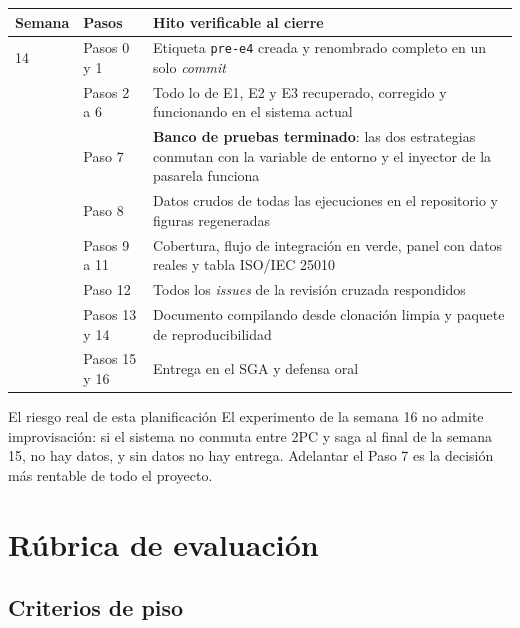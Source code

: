 \documentclass[11pt,a4paper]{article}
\begin{document}
	\begin{center}
		\small
		\begin{tabular}{@{}p{1.6cm}p{5.6cm}p{7.6cm}@{}}
			\toprule
			\textbf{Semana} & \textbf{Pasos} & \textbf{Hito verificable al cierre} \\
			\midrule
			14 & Pasos 0 y 1 & Etiqueta \texttt{pre-e4} creada y renombrado completo en un solo \emph{commit} \\
			\addlinespace
			15 & Pasos 2 a 6 & Todo lo de E1, E2 y E3 recuperado, corregido y funcionando en el sistema actual \\
			\addlinespace
			15 & Paso 7 & \textbf{Banco de pruebas terminado}: las dos estrategias conmutan con la variable de entorno y el inyector de la pasarela funciona \\
			\addlinespace
			16 & Paso 8 & Datos crudos de todas las ejecuciones en el repositorio y figuras regeneradas \\
			\addlinespace
			16 & Pasos 9 a 11 & Cobertura, flujo de integración en verde, panel con datos reales y tabla ISO/IEC 25010 \\
			\addlinespace
			16 & Paso 12 & Todos los \emph{issues} de la revisión cruzada respondidos \\
			\addlinespace
			17 & Pasos 13 y 14 & Documento compilando desde clonación limpia y paquete de reproducibilidad \\
			\addlinespace
			17 & Pasos 15 y 16 & Entrega en el SGA y defensa oral \\
			\bottomrule
		\end{tabular}
	\end{center}
	
	\begin{avisoBox}{El riesgo real de esta planificación}
		El experimento de la semana 16 no admite improvisación: si el sistema no conmuta entre 2PC y saga al final de la semana 15, no hay datos, y sin datos no hay entrega. Adelantar el Paso 7 es la decisión más rentable de todo el proyecto.
	\end{avisoBox}
	
	\section{Rúbrica de evaluación}
	
	\subsection{Criterios de piso}
	
\end{document}
